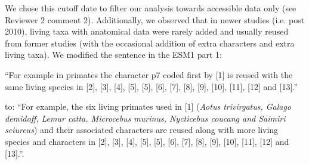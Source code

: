 \documentclass[12pt,letterpaper]{article}
\begin{document}
\begin{enumerate}
We chose this cutoff date to filter our analysis towards accessible data only (see Reviewer 2 comment 2).
Additionally, we observed that in newer studies (i.e. post 2010), living taxa with anatomical data were rarely added and usually reused from former studies (with the occasional addition of extra characters and extra living taxa).
We modified the sentence in the ESM1 part 1:

``For example in primates the character p7 coded first by [1] is reused with the same living species in [2], [3], [4], [5], [5], [6], [7], [8], [9], [10], [11], [12] and [13].''

\noindent to: ``For example, the six living primates used in [1] (\textit{Aotus trivirgatus, Galago demidoff, Lemur catta, Microcebus murinus, Nycticebus coucang and Saimiri sciureus}) and their associated characters are reused along with more living species and characters in [2], [3], [4], [5], [5], [6], [7], [8], [9], [10], [11], [12] and [13].''.

\end{enumerate}
\end{document}
